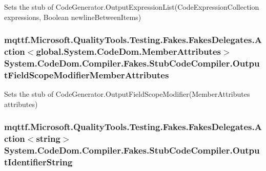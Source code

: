 Sets the stub of Code\-Generator.\-Output\-Expression\-List(\-Code\-Expression\-Collection expressions, Boolean newline\-Between\-Items)

\hypertarget{class_system_1_1_code_dom_1_1_compiler_1_1_fakes_1_1_stub_code_compiler_a7d14b73a469bc16165628b22a42a3ea2}{
\subsubsection[{Output\-Field\-Scope\-Modifier\-Member\-Attributes}]{\setlength{\rightskip}{0pt plus 5cm}mqttf.\-Microsoft.\-Quality\-Tools.\-Testing.\-Fakes.\-Fakes\-Delegates.\-Action$<$global.\-System.\-Code\-Dom.\-Member\-Attributes$>$ System.\-Code\-Dom.\-Compiler.\-Fakes.\-Stub\-Code\-Compiler.\-Output\-Field\-Scope\-Modifier\-Member\-Attributes}}\label{class_system_1_1_code_dom_1_1_compiler_1_1_fakes_1_1_stub_code_compiler_a7d14b73a469bc16165628b22a42a3ea2}


Sets the stub of Code\-Generator.\-Output\-Field\-Scope\-Modifier(\-Member\-Attributes attributes)

\hypertarget{class_system_1_1_code_dom_1_1_compiler_1_1_fakes_1_1_stub_code_compiler_ad4e77cf5c7172b983c9c5b0387eec736}{
\subsubsection[{Output\-Identifier\-String}]{\setlength{\rightskip}{0pt plus 5cm}mqttf.\-Microsoft.\-Quality\-Tools.\-Testing.\-Fakes.\-Fakes\-Delegates.\-Action$<$string$>$ System.\-Code\-Dom.\-Compiler.\-Fakes.\-Stub\-Code\-Compiler.\-Output\-Identifier\-String}}\label{class_system_1_1_code_dom_1_1_compiler_1_1_fakes_1_1_stub_code_compiler_ad4e77cf5c7172b983c9c5b0387eec736}



